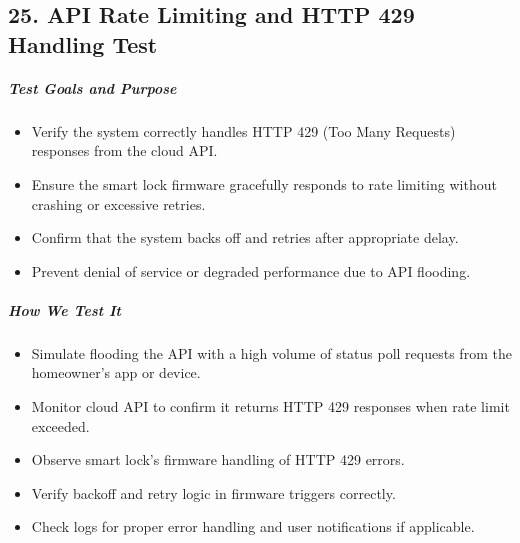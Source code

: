 \newpage
\begin{samepage}

\subsection*{25. API Rate Limiting and HTTP 429 Handling Test}
\subparagraph{Test Goals and Purpose}
\begin{itemize}
    \item Verify the system correctly handles HTTP 429 (Too Many Requests) responses from the cloud API.
    \item Ensure the smart lock firmware gracefully responds to rate limiting without crashing or excessive retries.
    \item Confirm that the system backs off and retries after appropriate delay.
    \item Prevent denial of service or degraded performance due to API flooding.
\end{itemize}

\subparagraph{How We Test It}
\begin{itemize}
    \item Simulate flooding the API with a high volume of status poll requests from the homeowner’s app or device.
    \item Monitor cloud API to confirm it returns HTTP 429 responses when rate limit exceeded.
    \item Observe smart lock’s firmware handling of HTTP 429 errors.
    \item Verify backoff and retry logic in firmware triggers correctly.
    \item Check logs for proper error handling and user notifications if applicable.
\end{itemize}


\end{samepage}
